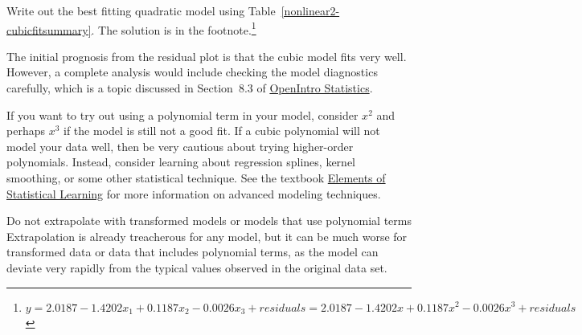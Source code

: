 \begin{exercise}
Write out the best fitting quadratic model using Table~\ref{nonlinear2-cubicfitsummary}. The solution is in the footnote.\footnote{$y = 2.0187 - 1.4202x_1 + 0.1187x_2 - 0.0026x_3 + residuals = 2.0187 - 1.4202x + 0.1187x^2 - 0.0026x^3 + residuals$}
\end{exercise}

The initial prognosis from the residual plot is that the cubic model fits very well. However, a complete analysis would include checking the model diagnostics carefully, which is a topic discussed in Section~8.3 of \href{http://www.openintro.org/stat/textbook.php}{OpenIntro Statistics}.

\begin{tipBox}{
If you want to try out using a polynomial term in your model, consider $x^2$ and perhaps $x^3$ if the model is still not a good fit. If a cubic polynomial will not model your data well, then be very cautious about trying higher-order polynomials. Instead, consider learning about regression splines, kernel smoothing, or some other statistical technique. See the textbook \href{http://www.openintro.org/stat/supplements.php?feature=regression_online_extra_more_free_books}{Elements of Statistical Learning} for more information on advanced modeling techniques.}
\end{tipBox} 

\begin{caution}{Do not extrapolate with transformed models or models that use polynomial terms}
{Extrapolation is already treacherous for any model, but it can be much worse for transformed data or data that includes polynomial terms, as the model can deviate very rapidly from the typical values observed in the original data set.}
\end{caution}

































